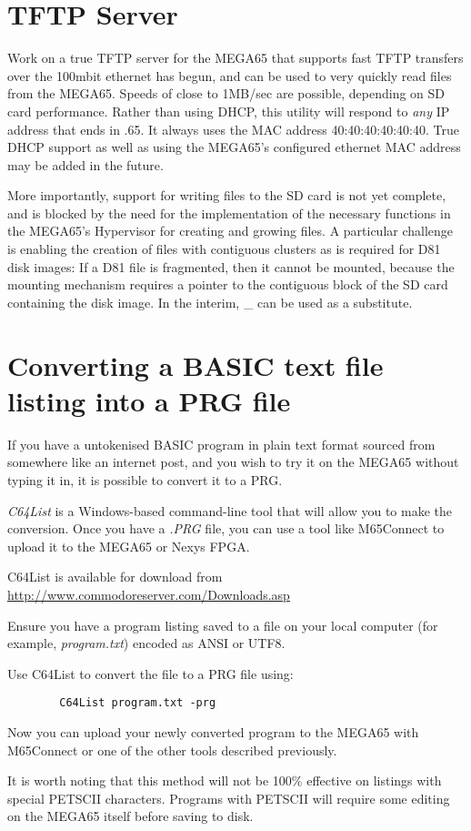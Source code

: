 \section{TFTP Server}

Work on a true TFTP server for the MEGA65 that supports fast
TFTP transfers over the 100mbit ethernet has begun, and can be used to
very quickly read files from the MEGA65. Speeds of close to 1MB/sec
are possible, depending on SD card performance.  Rather than using
DHCP, this utility will respond to {\em any} IP address that ends in
.65. It always uses the MAC address 40:40:40:40:40:40. True DHCP
support as well as using the MEGA65's configured ethernet MAC address
may be added in the future. 

More importantly, support for writing
files to the SD card is not yet complete, and is blocked by the need
for the implementation of the necessary functions in the MEGA65's Hypervisor for creating and
growing files.  A particular challenge is enabling the creation of
files with contiguous clusters as is required for D81 disk images: If
a D81 file is fragmented, then it cannot be mounted, because the
mounting mechanism requires a pointer to the contiguous block of the
SD card containing the disk image.
In the interim, \_ can be used as a substitute.

\section{Converting a BASIC text file listing into a PRG file}

If you have a untokenised BASIC program in plain text format sourced from somewhere like an internet post, and you wish to try it on the MEGA65 without typing it in, it is possible to convert it to a PRG.

\textit{C64List} is a Windows-based command-line tool that will allow you to make the conversion. Once you have a \textit{.PRG} file, you can use a tool like M65Connect to upload it to the MEGA65 or Nexys FPGA. 

C64List is available for download from \url{http://www.commodoreserver.com/Downloads.asp}

Ensure you have a program listing saved to a file on your local computer (for example, \textit{program.txt}) encoded as ANSI or UTF8.

Use C64List to convert the file to a PRG file using:
    
\begin{tcolorbox}[colback=black,coltext=white]
    \begin{verbatim}
        C64List program.txt -prg
    \end{verbatim}
\end{tcolorbox}

Now you can upload your newly converted program to the MEGA65 with M65Connect or one of the other tools described previously.

It is worth noting that this method will not be 100\% effective on listings with special PETSCII characters. Programs with PETSCII will require some editing on the MEGA65 itself before saving to disk.
